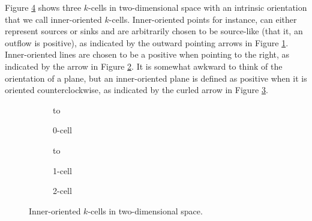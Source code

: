Figure \ref{fig:innerExample} shows three $k$-cells in two-dimensional space with an intrinsic orientation that we call inner-oriented $k$-cells. Inner-oriented points for instance, can either represent sources or sinks and are arbitrarily chosen to be source-like (that it, an outflow is positive), as indicated by the outward pointing arrows in Figure \ref{fig:inner0Cell}. Inner-oriented lines are chosen to be a positive when pointing to the right, as indicated by the arrow in Figure \ref{fig:inner1Cell}. It is somewhat awkward to think of the orientation of a plane, but an inner-oriented plane is defined as positive when it is oriented counterclockwise, as indicated by the curled arrow in Figure \ref{fig:inner2Cell}.
\begin{figure}[ht]
    \newsavebox\boxInner
    \centering
    \begin{subfigure}[c]{0.3\textwidth}
        \centering
        \vbox to \ht{}
        \caption{0-cell}
        \label{fig:inner0Cell}
    \end{subfigure}
    \begin{subfigure}[c]{0.3\textwidth}
        \centering
        \vbox to \ht{}
        \caption{1-cell}
        \label{fig:inner1Cell}
    \end{subfigure}
    \begin{subfigure}[c]{0.3\textwidth}
        \centering
        \centering
        \usebox{\boxInner}
        \caption{2-cell}
        \label{fig:inner2Cell}
    \end{subfigure}
    \caption{Inner-oriented $k$-cells in two-dimensional space.}
    \label{fig:innerExample}
\end{figure}
